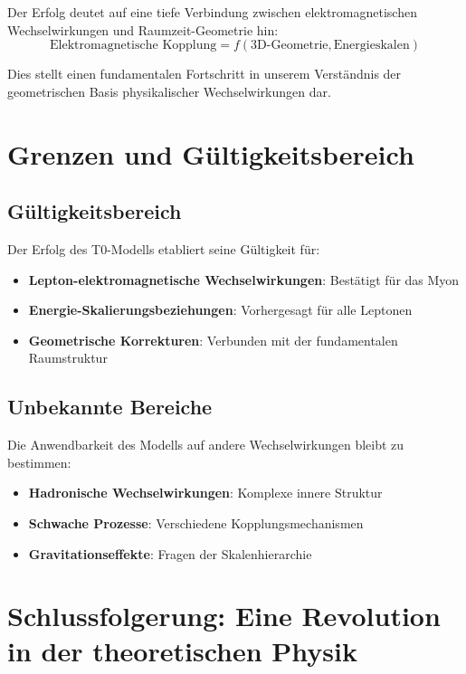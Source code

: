 \documentclass[12pt,a4paper]{report}
\begin{document}
Der Erfolg deutet auf eine tiefe Verbindung zwischen elektromagnetischen Wechselwirkungen und Raumzeit-Geometrie hin:
\begin{equation}
	\text{Elektromagnetische Kopplung} = f(\text{3D-Geometrie}, \text{Energieskalen})
	\label{eq:electromagnetic_geometry}
\end{equation}

Dies stellt einen fundamentalen Fortschritt in unserem Verständnis der geometrischen Basis physikalischer Wechselwirkungen dar.

\section{Grenzen und Gültigkeitsbereich}
\label{sec:limitations_scope}

\subsection{Gültigkeitsbereich}
\label{subsec:domain_validity}

Der Erfolg des T0-Modells etabliert seine Gültigkeit für:
\begin{itemize}
	\item \textbf{Lepton-elektromagnetische Wechselwirkungen}: Bestätigt für das Myon
	\item \textbf{Energie-Skalierungsbeziehungen}: Vorhergesagt für alle Leptonen
	\item \textbf{Geometrische Korrekturen}: Verbunden mit der fundamentalen Raumstruktur
\end{itemize}

\subsection{Unbekannte Bereiche}
\label{subsec:unknown_domains}

Die Anwendbarkeit des Modells auf andere Wechselwirkungen bleibt zu bestimmen:
\begin{itemize}
	\item \textbf{Hadronische Wechselwirkungen}: Komplexe innere Struktur
	\item \textbf{Schwache Prozesse}: Verschiedene Kopplungsmechanismen
	\item \textbf{Gravitationseffekte}: Fragen der Skalenhierarchie
\end{itemize}

\section{Schlussfolgerung: Eine Revolution in der theoretischen Physik}
\label{sec:conclusion}
\end{document}
